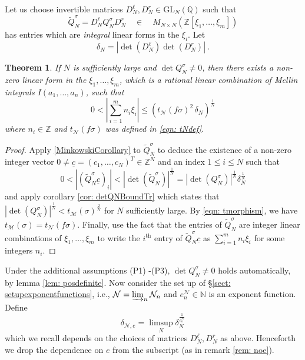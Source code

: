 \documentclass[a4paper,10pt]{amsart}
\newtheorem{thm}{Theorem}[section]
\theoremstyle{definition}
\theoremstyle{remark}
\numberwithin{equation}{section}
\newcommand{\Z}{\mathbb Z}
\newcommand{\Q}{\mathbb Q}
\newcommand{\0}{\color{blue}{\mathsf{0}}}
\begin{document}
  Let us choose invertible matrices $D^{\ell}_N, D^{r}_N \in \mathrm{GL}_{N}(\Q)$ such that 
  \begin{equation} \label{DDprime matrices}  \widetilde{Q}^{\sigma}_N = D^{\ell}_N Q^{\sigma}_N D^r_N  \quad \in \quad M_{N\times N} ( \Z[\xi_1,\ldots, \xi_m])
  \end{equation} 
  has entries which are \emph{integral} linear forms in the $\xi_i$.  Let 
  \[ \delta_N = |\det (D^{\ell}_N) \det(D^r_N)|\ .\]
  \begin{thm}  \label{thm: smalllinearform} If   $N$ is sufficiently large and $\det Q^{\sigma}_N \neq 0$,  then  there exists a non-zero linear form in the $\xi_1,\ldots, \xi_m$, which is a rational linear combination of Mellin integrals $I(a_1,\ldots, a_n)$,  such that 
  \[  0 <  \left| \sum_{i=1}^m  n_i \xi_i \right| \leq  \left( t_{\mathcal{N}}(f  \sigma )^2 \, \delta_N\right)^{\frac{1}{N}}   
\]   
where $n_i \in \Z$ and $t_{\mathcal{N}}(f \sigma)$ was defined in \eqref{eqn: tNdef}. 
  \end{thm}
  \begin{proof} Apply \eqref{MinkowskiCorollary} to $\widetilde{Q}^{\sigma}_N$ to deduce the existence of a non-zero integer   vector $0\neq \underline{c}=(c_1,\ldots, c_N)^T\in \Z^N$  and an index $1 \leq i \leq N$ such that 
  \[ 0 < \left|  (\widetilde{Q}^{\sigma}_N \underline{c})_i \right| <   \left| \det (\widetilde{Q}^{\sigma}_N) \right|^{\frac{1}{N}}  =  |\det(Q^{\sigma}_N)|^{\frac{1}{N}} \delta_N^{\frac{1}{N}} \] 
  and apply  corollary  \ref{cor: detQNBoundTr}  which states that $ |\det(Q^{\sigma}_N)|^{\frac{1}{N}}< t_{\mathcal{M}}(\sigma)^{\frac{2}{N}}$ for $N$ sufficiently large. By \eqref{eqn: tmorphism}, 
  we have $t_{\mathcal{M}}(\sigma) =  t_{\mathcal{N}}(f \sigma )$. 
   Finally, use the fact that the entries of $\widetilde{Q}^{\sigma}_N$ are integer linear combinations of $\xi_1,\ldots, \xi_m$ to write the $i^{\mathrm{th}}$ entry of  $\widetilde{Q}^{\sigma}_N \underline{c}$ as   $\sum_{i=1}^m  n_i \xi_i$ for some integers $n_i$.
  \end{proof}
  Under the additional assumptions (P1) -(P3),  $\det Q_N^{\sigma}\neq 0$ holds automatically, by lemma \ref{lem: posdefinite}. 
    Now consider the set up  of \S \ref{sect: setupexponentfunctions}, i.e.,  $\mathcal{N} = \varinjlim_n \mathcal{N}_n$ and $e^{\mathcal{N}}_n \in 
    \mathbb{N}$ is an exponent function. Define
  \[ \delta_{\mathcal{N},e} = \limsup_N  \delta_N^{\frac{1}{e^{\mathcal{N}}_n}} \]
  which we recall  depends on the choices of matrices $D^{\ell}_N, D^r_N$ as above. Henceforth we drop the dependence on $e$ from the subscript (as in remark \ref{rem: noe}). 
  
\end{document}

